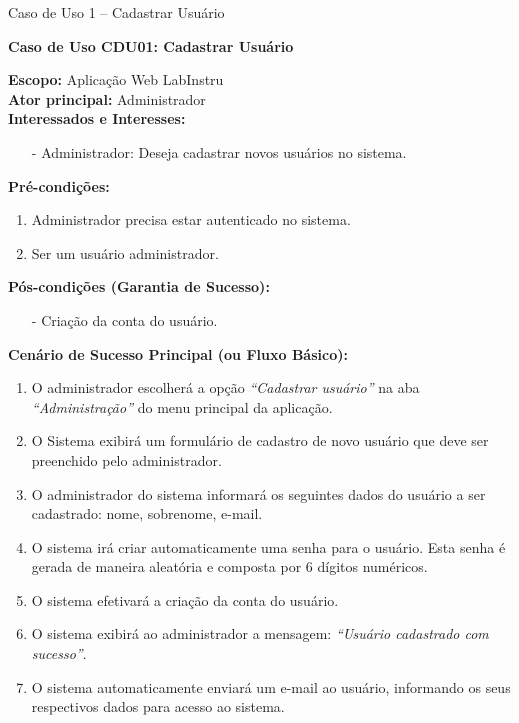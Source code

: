 
\begin{quadro}\caption{Caso de Uso 1 -- Cadastrar Usuário}
\hfill
\end{quadro}
	\begin{mdframed}[nobreak=false]
		\textbf{Caso de Uso CDU01: Cadastrar Usuário}\\
		\begin{flushleft}
		\textbf{Escopo:} Aplicação Web LabInstru\\
		\textbf{Ator principal:} Administrador\\
		\textbf{Interessados e Interesses:}
		\begin{itemize}
			\item[-] Administrador: Deseja cadastrar novos usuários no sistema.
		\end{itemize}
		\textbf{Pré-condições:}\\
			 \begin{enumerate}
			 	\item{Administrador precisa estar autenticado no sistema.}
			 	\item{Ser um usuário administrador.}
			 \end{enumerate}
		\textbf{Pós-condições (Garantia de Sucesso):}
			\begin{itemize}
				\item[-] Criação da conta do usuário.
			\end{itemize}
		\textbf{Cenário de Sucesso Principal (ou Fluxo Básico):}\\
			\begin{enumerate}
			 	\item{O administrador escolherá a opção \textit{``Cadastrar usuário''} na aba \textit{``Administração''} do menu principal da aplicação.}
			 	\item{O Sistema exibirá um formulário de cadastro de novo usuário que deve ser preenchido pelo administrador.}
			 	\item O administrador do sistema informará os seguintes dados do usuário a ser cadastrado: nome, sobrenome, e-mail.
			 	\item{O sistema irá criar automaticamente uma senha para o usuário. Esta senha é gerada de maneira aleatória e composta por 6 dígitos numéricos.}
			 	\item{O sistema efetivará a criação da conta do usuário.}
			 	\item{O sistema exibirá ao administrador a mensagem: \textit{``Usuário cadastrado com sucesso''}.}
			 	\item{O sistema automaticamente enviará um e-mail ao usuário, informando os seus respectivos dados para acesso ao sistema.}
			 \end{enumerate}


\end{flushleft}
\end{mdframed}
